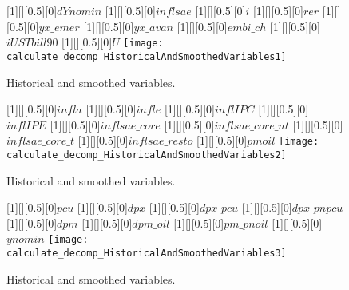  
\begin{figure}[H]
[1][][0.5][0]{$ dYnomin $}
[1][][0.5][0]{$ inflsae $}
[1][][0.5][0]{$ i $}
[1][][0.5][0]{$ rer $}
[1][][0.5][0]{$ yx\_emer $}
[1][][0.5][0]{$ yx\_avan $}
[1][][0.5][0]{$ embi\_ch $}
[1][][0.5][0]{$ iUSTbill90 $}
[1][][0.5][0]{$ U $}
\centering 
\texttt{[image: calculate\_decomp\_HistoricalAndSmoothedVariables1]}
\caption{Historical and smoothed variables.}\label{Fig:HistoricalAndSmoothedVariables:1}
\end{figure}

\begin{figure}[H]
[1][][0.5][0]{$ infla $}
[1][][0.5][0]{$ infle $}
[1][][0.5][0]{$ inflIPC $}
[1][][0.5][0]{$ inflIPE $}
[1][][0.5][0]{$ inflsae\_core $}
[1][][0.5][0]{$ inflsae\_core\_nt $}
[1][][0.5][0]{$ inflsae\_core\_t $}
[1][][0.5][0]{$ inflsae\_resto $}
[1][][0.5][0]{$ pmoil $}
\centering 
\texttt{[image: calculate\_decomp\_HistoricalAndSmoothedVariables2]}
\caption{Historical and smoothed variables.}\label{Fig:HistoricalAndSmoothedVariables:2}
\end{figure}

\begin{figure}[H]
[1][][0.5][0]{$ pcu $}
[1][][0.5][0]{$ dpx $}
[1][][0.5][0]{$ dpx\_pcu $}
[1][][0.5][0]{$ dpx\_pnpcu $}
[1][][0.5][0]{$ dpm $}
[1][][0.5][0]{$ dpm\_oil $}
[1][][0.5][0]{$ pm\_pnoil $}
[1][][0.5][0]{$ ynomin $}
\centering 
\texttt{[image: calculate\_decomp\_HistoricalAndSmoothedVariables3]}
\caption{Historical and smoothed variables.}\label{Fig:HistoricalAndSmoothedVariables:3}
\end{figure}


